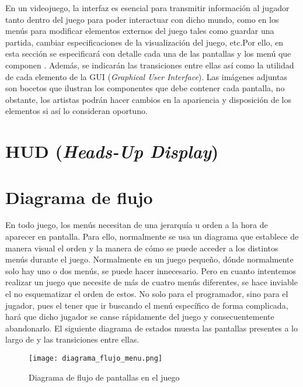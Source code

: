 En un videojuego, la interfaz es esencial para transmitir información al jugador tanto dentro del juego para poder interactuar con dicho mundo, como en los menús para modificar elementos externos del juego tales como guardar una partida, cambiar especificaciones de la visualización del juego, etc.Por ello, en esta sección se especificará con detalle cada una de las pantallas y los menú que componen \nombrejuego. Además, se indicarán las transiciones entre ellas así como la utilidad de cada elemento de la GUI (\emph{Graphical User Interface}). Las imágenes adjuntas son bocetos que ilustran los componentes que debe contener cada pantalla, no obstante, los artistas podrán hacer cambios en la apariencia y disposición de los elementos si así lo consideran oportuno.
    
    \section{HUD (\emph{Heads-Up Display})}
    
    \label{sec:menus}
        \section{Diagrama de flujo}
        En todo juego, los menús necesitan de una jerarquía u orden a la hora de aparecer en pantalla. Para ello, normalmente se usa un diagrama que establece de manera visual el orden y la manera de cómo se puede acceder a los distintos menús durante el juego. Normalmente en un juego pequeño, dónde normalmente solo hay uno o dos menús, se puede hacer innecesario. Pero en cuanto intentemos realizar un juego que necesite de más de cuatro menús diferentes, se hace inviable el no esquematizar el orden de estos. No solo para el programador, sino para el jugador, pues el tener que ir buscando el menú específico de forma complicada, hará que dicho jugador se canse rápidamente del juego y consecuentemente abandonarlo. El siguiente diagrama de estados muesta las pantallas presentes a lo largo de \nombrejuego y las transiciones entre ellas.
        
        \begin{figure}[H] 
                \begin{center}
                    \texttt{[image: diagrama\_flujo\_menu.png]}
                \end{center}
                \caption{Diagrama de flujo de pantallas en el juego}
                \label{fig:diagrama-flujo-menu}
            \end{figure}
        
